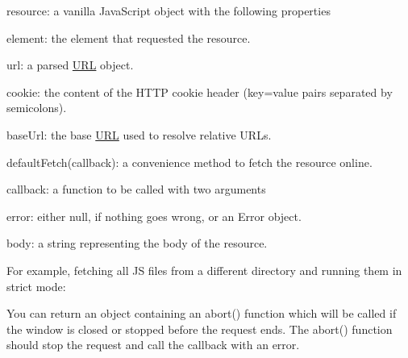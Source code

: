 \begin{DoxyItemize}
\item {\ttfamily resource}\+: a vanilla Java\+Script object with the following properties
\begin{DoxyItemize}
\item {\ttfamily element}\+: the element that requested the resource.
\item {\ttfamily url}\+: a parsed \mbox{\hyperlink{namespace_u_r_l}{U\+RL}} object.
\item {\ttfamily cookie}\+: the content of the H\+T\+TP cookie header ({\ttfamily key=value} pairs separated by semicolons).
\item {\ttfamily base\+Url}\+: the base \mbox{\hyperlink{namespace_u_r_l}{U\+RL}} used to resolve relative U\+R\+Ls.
\item {\ttfamily default\+Fetch(callback)}\+: a convenience method to fetch the resource online.
\end{DoxyItemize}
\item {\ttfamily callback}\+: a function to be called with two arguments
\begin{DoxyItemize}
\item {\ttfamily error}\+: either {\ttfamily null}, if nothing goes wrong, or an {\ttfamily Error} object.
\item {\ttfamily body}\+: a string representing the body of the resource.
\end{DoxyItemize}
\end{DoxyItemize}

For example, fetching all JS files from a different directory and running them in strict mode\+:




You can return an object containing an {\ttfamily abort()} function which will be called if the window is closed or stopped before the request ends. The {\ttfamily abort()} function should stop the request and call the callback with an error.

